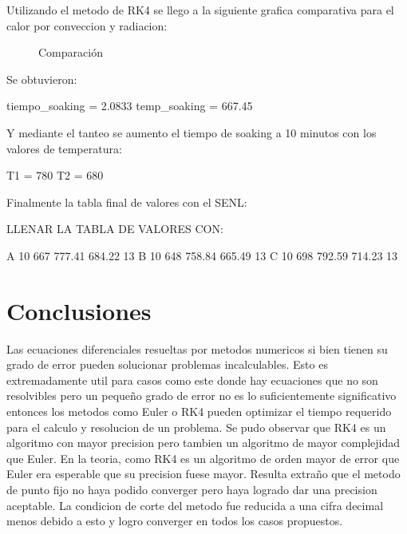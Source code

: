 \documentclass[11pt,a4paper]{article}
\begin{document}
Utilizando el metodo de RK4 se llego a la siguiente grafica comparativa para el calor por conveccion y radiacion:

\begin{figure}[H]
	\caption{Comparación}
	\label{fig:comp}
\end{figure}

Se obtuvieron:

tiempo\_soaking =  2.0833
temp\_soaking =  667.45

Y mediante el tanteo se aumento el tiempo de soaking a 10 minutos con los valores de temperatura:

T1 = 780
T2 = 680

Finalmente la tabla final de valores con el SENL:

LLENAR LA TABLA DE VALORES CON:

A 10 667 777.41 684.22 13
B 10 648 758.84 665.49 13
C 10 698 792.59 714.23 13

\section{Conclusiones}

Las ecuaciones diferenciales resueltas por metodos numericos si bien tienen su grado de error pueden solucionar problemas incalculables. Esto es extremadamente util para casos como este donde hay ecuaciones que no son resolvibles pero un pequeño grado de error no es lo suficientemente significativo entonces los metodos como Euler o RK4 pueden optimizar el tiempo requerido para el calculo y resolucion de un problema. Se pudo observar que RK4 es un algoritmo con mayor precision pero tambien un algoritmo de mayor complejidad que Euler. En la teoria, como RK4 es un algoritmo de orden mayor de error que Euler era esperable que su precision fuese mayor. Resulta extraño que el metodo de punto fijo no haya podido converger pero haya logrado dar una precision aceptable. La condicion de corte del metodo fue reducida a una cifra decimal menos debido a esto y logro converger en todos los casos propuestos.
\end{document}

